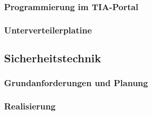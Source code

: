 \subsubsection{Programmierung im TIA-Portal}

\subsubsection{Unterverteilerplatine}


\subsection{Sicherheitstechnik}
\subsubsection{Grundanforderungen und Planung}
\subsubsection{Realisierung}